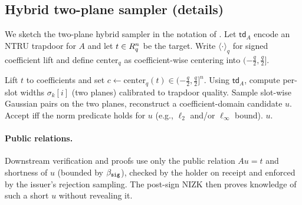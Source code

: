 \subsection{Hybrid two-plane sampler (details)}
\label{subsec:hybrid-sampler}
We sketch the two-plane hybrid sampler in the notation of \cite{EPRINT:ENSTW23}. Let \(\mathsf{td}_A\) encode an
NTRU trapdoor for \(A\) and let \(t\in R_q^n\) be the target. Write \(\langle\cdot\rangle_q\) for signed coefficient lift
and define \(\mathrm{center}_q\) as coefficient-wise centering into \((-\frac{q}{2},\frac{q}{2}]\).

\begin{algorithm}[H]
\caption{\(\SampPre(\mathsf{td}_A,t)\): two-plane hybrid sampler (sketch)}
\label{alg:samppre}
\begin{algorithmic}[1]
\State Lift \(t\) to coefficients and set \(c \gets \mathrm{center}_q(t)\in(-\frac{q}{2},\frac{q}{2}]^n\).
\State Using \(\mathsf{td}_A\), compute per-slot widths \(\sigma_k[i]\) (two planes) calibrated to trapdoor quality.
\Repeat
  \State Sample slot-wise Gaussian pairs on the two planes, reconstruct a coefficient-domain candidate \(u\).
  \State Accept iff the norm predicate holds for \(u\) (e.g., \(\ell_2\) and/or \(\ell_\infty\) bound).
\State \Return \(u\).
\end{algorithmic}
\end{algorithm}

\paragraph{Public relations.}
Downstream verification and proofs use only the public relation \(A u=t\) and shortness of \(u\) (bounded by \(\beta_{\mathtt{sig}}\)),
checked by the holder on receipt and enforced by the issuer’s rejection sampling. The post-sign NIZK then proves
knowledge of such a short \(u\) without revealing it.
